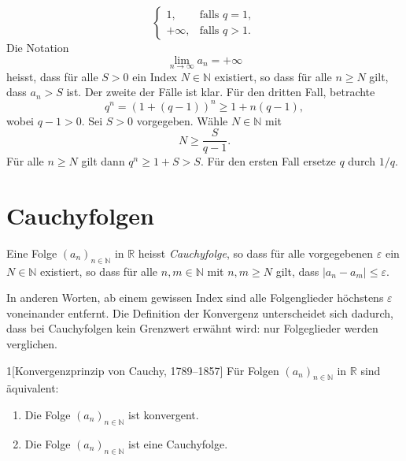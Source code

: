 \documentclass[../main.tex]{subfiles}
\begin{document}
\begin{examples}
\begin{enumerate}[(1)]
\[\begin{cases}
		    1, & \text{falls } q = 1, \\
		    +\infty, & \text{falls } q > 1.
	    \end{cases}
	  \]
	Die Notation
	\[
	  \lim_{n \to \infty} a_n = + \infty
	\]
	heisst, dass für alle $S > 0$ ein Index $N \in \mathbb{N}$
	existiert, so dass für alle $n \geq N$ gilt, dass
	$a_n > S$ ist.
	Der zweite der Fälle ist klar. Für den dritten Fall, 
	betrachte
	\[
		q^n = {\left( 1 + (q-1) \right)}^n \geq 1 + n(q-1),
	\]
	wobei $q-1 > 0$. 
	Sei $S > 0$ vorgegeben. Wähle $N \in \mathbb{N}$ mit
	\[
	  N \geq \frac{S}{q-1}.
	\]
	Für alle $n \geq N$ gilt dann $q^n \geq 1 + S > S$.
	Für den ersten Fall ersetze $q$ durch $1/q$.
\end{enumerate}
\end{examples}

\section{Cauchyfolgen}
\begin{definition}
Eine Folge 
${\left( a_n \right)}_{n \in \mathbb{N}}$ in $\mathbb{R}$ 
heisst \emph{Cauchyfolge}, so dass für alle
vorgegebenen $\varepsilon$ ein $N \in \mathbb{N}$ existiert,
so dass für alle $n, m \in \mathbb{N}$ mit $n,m \geq N$ gilt,
dass $|a_n - a_m| \leq \varepsilon$.
\end{definition}

In anderen Worten, ab einem gewissen Index sind alle
Folgenglieder höchstens $\varepsilon$ voneinander 
entfernt. Die Definition der Konvergenz unterscheidet
sich dadurch, dass bei Cauchyfolgen kein Grenzwert
erwähnt wird: nur Folgeglieder werden verglichen.

\begin{manualtheorem}{1}[Konvergenzprinzip
  von Cauchy, 1789--1857]
Für Folgen ${\left( a_n \right)}_{n \in \mathbb{N}}$ in $\mathbb{R}$
  sind äquivalent:
  \begin{enumerate}[\normalfont(i)]
    \item Die Folge ${\left( a_n \right)}_{n \in \mathbb{N}}$
      ist konvergent.
    \item Die Folge ${\left( a_n \right)}_{n \in \mathbb{N}}$
      ist eine Cauchyfolge.
  \end{enumerate}
\end{manualtheorem}
\end{document}
